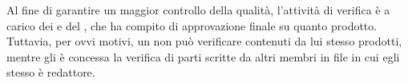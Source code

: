 Al fine di garantire un maggior controllo della qualità, l'attività di verifica \`e a carico dei \vers \space e del \Res , che ha compito di approvazione finale su quanto prodotto. Tuttavia, per ovvi motivi, un \ver \space non può verificare contenuti da lui stesso prodotti, mentre gli è concessa la verifica di parti scritte da altri membri in file in cui egli stesso è redattore.